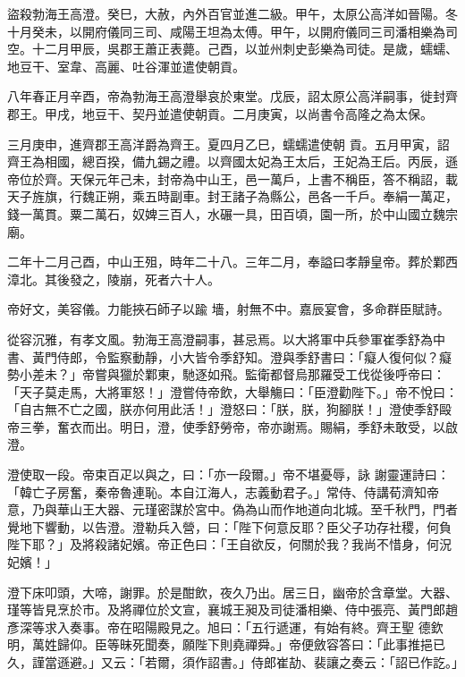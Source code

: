 \begin{pinyinscope}
 盜殺勃海王高澄。癸巳，大赦，內外百官並進二級。甲午，太原公高洋如晉陽。冬十月癸未，以開府儀同三司、咸陽王坦為太傅。甲午，以開府儀同三司潘相樂為司空。十二月甲辰，吳郡王蕭正表薨。己酉，以並州刺史彭樂為司徒。是歲，蠕蠕、地豆干、室韋、高麗、吐谷渾並遣使朝貢。



 八年春正月辛酉，帝為勃海王高澄舉哀於東堂。戊辰，詔太原公高洋嗣事，徙封齊郡王。甲戌，地豆干、契丹並遣使朝貢。二月庚寅，以尚書令高隆之為太保。



 三月庚申，進齊郡王高洋爵為齊王。夏四月乙巳，蠕蠕遣使朝
 貢。五月甲寅，詔齊王為相國，總百揆，備九錫之禮。以齊國太妃為王太后，王妃為王后。丙辰，遜帝位於齊。天保元年己未，封帝為中山王，邑一萬戶，上書不稱臣，答不稱詔，載天子旌旗，行魏正朔，乘五時副車。封王諸子為縣公，邑各一千戶。奉絹一萬疋，錢一萬貫。粟二萬石，奴婢三百人，水碾一具，田百頃，園一所，於中山國立魏宗廟。



 二年十二月己酉，中山王殂，時年二十八。三年二月，奉謚曰孝靜皇帝。葬於鄴西漳北。其後發之，陵崩，死者六十人。



 帝好文，美容儀。力能挾石師子以踰
 墻，射無不中。嘉辰宴會，多命群臣賦詩。



 從容沉雅，有孝文風。勃海王高澄嗣事，甚忌焉。以大將軍中兵參軍崔季舒為中書、黃門侍郎，令監察動靜，小大皆令季舒知。澄與季舒書曰：「癡人復何似？癡勢小差未？」帝嘗與獵於鄴東，馳逐如飛。監衛都督烏那羅受工伐從後呼帝曰：「天子莫走馬，大將軍怒！」澄嘗侍帝飲，大舉觴曰：「臣澄勸陛下。」帝不悅曰：「自古無不亡之國，朕亦何用此活！」澄怒曰：「朕，朕，狗腳朕！」澄使季舒毆帝三拳，奮衣而出。明日，澄，使季舒勞帝，帝亦謝焉。賜絹，季舒未敢受，以啟澄。



 澄使取一段。帝束百疋以與之，曰：「亦一段爾。」帝不堪憂辱，詠
 謝靈運詩曰：「韓亡子房奮，秦帝魯連恥。本自江海人，志義動君子。」常侍、侍講荀濟知帝意，乃與華山王大器、元瑾密謀於宮中。偽為山而作地道向北城。至千秋門，門者覺地下響動，以告澄。澄勒兵入營，曰：「陛下何意反耶？臣父子功存社稷，何負陛下耶？」及將殺諸妃嬪。帝正色曰：「王自欲反，何關於我？我尚不惜身，何況妃嬪！」



 澄下床叩頭，大啼，謝罪。於是酣飲，夜久乃出。居三日，幽帝於含章堂。大器、瑾等皆見烹於市。及將禪位於文宣，襄城王昶及司徒潘相樂、侍中張亮、黃門郎趙彥深等求入奏事。帝在昭陽殿見之。旭曰：「五行遞運，有始有終。齊王聖
 德欽明，萬姓歸仰。臣等昧死聞奏，願陛下則堯禪舜。」帝便斂容答曰：「此事推挹已久，謹當遜避。」又云：「若爾，須作詔書。」侍郎崔劼、裴讓之奏云：「詔已作訖。」




\end{pinyinscope}
